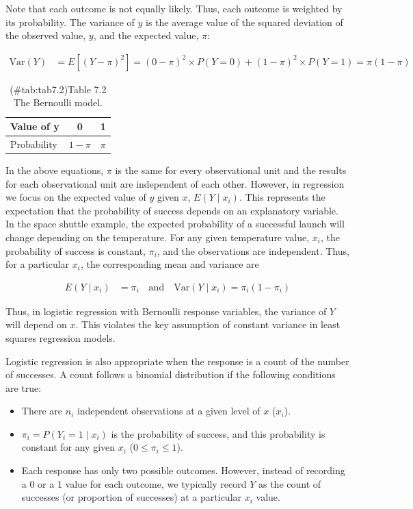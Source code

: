 \documentclass[
]{report}
\providecommand{\tightlist}{%
  \setlength{\itemsep}{0pt}\setlength{\parskip}{0pt}}
\begin{document}
Note that each outcome is not equally likely. Thus, each outcome is weighted by its probability. The variance of \(y\) is the average value of the squared deviation of the observed value, \(y\), and the expected value, \(\pi\):

\begin{align}
\mathrm{Var}(Y) &= E[(Y - \pi)^2] = (0 - \pi)^2 \times P(Y = 0) + (1 - \pi)^2 \times P(Y = 1) = \pi (1 - \pi) \tag{7.19}
\end{align}

\begin{table}[!h]
\centering
\caption{(\#tab:tab7.2)Table 7.2 The Bernoulli model.}
\centering
\begin{tabular}[t]{lcc}
\toprule
Value of y & 0 & 1\\
\midrule
Probability & $1 - \pi$ & $\pi$\\
\bottomrule
\end{tabular}
\end{table}

In the above equations, \(\pi\) is the same for every observational unit and the results for each observational unit are independent of each other. However, in regression we focus on the expected value of \(y\) given \(x\), \(E(Y \mid x_i)\). This represents the expectation that the probability of success depends on an explanatory variable. In the space shuttle example, the expected probability of a successful launch will change depending on the temperature. For any given temperature value, \(x_i\), the probability of success is constant, \(\pi_i\), and the observations are independent. Thus, for a particular \(x_i\), the corresponding mean and variance are

\begin{align}
E(Y \mid x_i) &= \pi_i \quad \text{and} \quad \mathrm{Var}(Y \mid x_i) = \pi_i (1 - \pi_i) 
\tag{7.20}
\end{align}

Thus, in logistic regression with Bernoulli response variables, the variance of \(Y\) will depend on \(x\). This violates
the key assumption of constant variance in least squares regression models.

Logistic regression is also appropriate when the response is a count of the number of successes. A count follows a binomial distribution if the following conditions are true:

\begin{itemize}
\tightlist
\item
  There are \(n_i\) independent observations at a given level of \(x\) (\(x_i\)).
\item
  \(\pi_i = P(Y_i = 1 \mid x_i)\) is the probability of success, and this probability is constant for any given \(x_i\) (\(0 \le \pi_i \le 1\)).
\item
  Each response has only two possible outcomes. However, instead of recording a 0 or a 1 value for each outcome, we typically record \(Y\) as the count of successes (or proportion of successes) at a particular \(x_i\) value.
\end{itemize}
\end{document}
